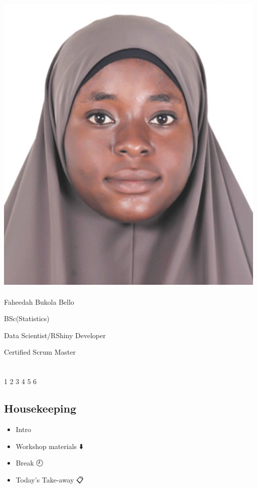 \documentclass[
  letterpaper,
  DIV=11,
  numbers=noendperiod]{scrartcl}
\begin{document}
\includegraphics[width=5.19792in,height=5.97917in]{images/faheedah.jpg}

Faheedah Bukola Bello

BSc(Statistics)

Data Scientist/RShiny Developer

Certified Scrum Master

\hypertarget{section}{%
\section{}\label{section}}

{1 2} 3 {4 5 6}

\hypertarget{housekeeping}{%
\subsection{Housekeeping}\label{housekeeping}}

\begin{itemize}
\item
  Intro {👋}
\item
  Workshop materials {⬇️}
\item
  Break {🕘}
\item
  Today's Take-away {📋}
\end{itemize}
\end{document}
